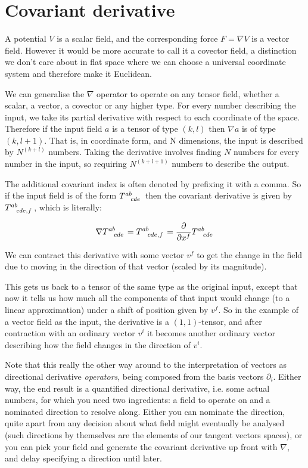 \section{Covariant derivative}

A potential $V$ is a scalar field, and the corresponding force $F = \nabla V$ is a vector field. However it would be more accurate to call it a covector field, a distinction we don't care about in flat space where we can choose a universal coordinate system and therefore make it Euclidean.

We can generalise the $\nabla$ operator to operate on any tensor field, whether a scalar, a vector, a covector or any higher type. For every number describing the input, we take its partial derivative with respect to each coordinate of the space. Therefore if the input field $a$ is a tensor of type $(k, l)$ then $\nabla a$ is of type $(k, l + 1)$. That is, in coordinate form, and N dimensions, the input is described by $N^{(k+l)}$ numbers. Taking the derivative involves finding $N$ numbers for every number in the input, so requiring $N^{(k+l+1)}$ numbers to describe the output.

The additional covariant index is often denoted by prefixing it with a comma. So if the input field is of the form $T\indices{^{ab}_{cde}}$ then the covariant derivative is given by $T\indices{^{ab}_{cde,f}}$, which is literally:

$$
\nabla T\indices{^{ab}_{cde}}
=
T\indices{^{ab}_{cde,f}}
=
\frac{\partial}{\partial x^f} T\indices{^{ab}_{cde}}
$$

We can contract this derivative with some vector $v^f$ to get the change in the field due to moving in the direction of that vector (scaled by its magnitude).

This gets us back to a tensor of the same type as the original input, except that now it tells us how much all the components of that input would change (to a linear approximation) under a shift of position given by $v^f$. So in the example of a vector field as the input, the derivative is a $(1, 1)$-tensor, and after contraction with an ordinary vector $v^i$ it becomes another ordinary vector describing how the field changes in the direction of $v^i$.

Note that this really the other way around to the interpretation of vectors as directional derivative \textit{operators}, being composed from the basis vectors $\partial_i$. Either way, the end result is a quantified directional derivative, i.e. some actual numbers, for which you need two ingredients: a field to operate on and a nominated direction to resolve along. Either you can nominate the direction, quite apart from any decision about what field might eventually be analysed (such directions by themselves are the elements of our tangent vectors spaces), or you can pick your field and generate the covariant derivative up front with $\nabla$, and delay specifying a direction until later.

